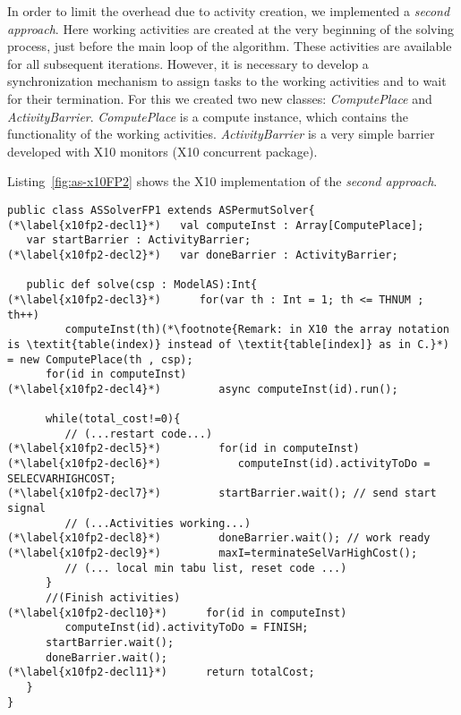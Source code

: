 \documentclass{llncs}
\begin{document}
In order to limit the overhead due to activity creation, we implemented a
\emph{second approach}. Here  working activities are created at the very
beginning of the solving process, just before the main loop of the algorithm.
These activities are available for all subsequent iterations.  However, it is
necessary to develop a synchronization mechanism to assign tasks to the
working activities and to wait for their termination. For this we created two
new classes: \emph{ComputePlace} and \emph{ActivityBarrier}.
\emph{ComputePlace} is a compute instance, which contains the functionality
of the working activities. \emph{ActivityBarrier} is a very simple barrier
developed with X10 monitors (X10 concurrent package).

Listing~\ref{fig:as-x10FP2} shows the X10 implementation of the
\emph{second approach}. 

\begin{lstlisting}[caption={Second approach to \emph{functional parallelism}},label=fig:as-x10FP2]
public class ASSolverFP1 extends ASPermutSolver{
(*\label{x10fp2-decl1}*)   val computeInst : Array[ComputePlace];
   var startBarrier : ActivityBarrier;
(*\label{x10fp2-decl2}*)   var doneBarrier : ActivityBarrier;

   public def solve(csp : ModelAS):Int{     
(*\label{x10fp2-decl3}*)      for(var th : Int = 1; th <= THNUM ; th++)
         computeInst(th)(*\footnote{Remark: in X10 the array notation is \textit{table(index)} instead of \textit{table[index]} as in C.}*) = new ComputePlace(th , csp);
      for(id in computeInst) 
(*\label{x10fp2-decl4}*)         async computeInst(id).run();
      
      while(total_cost!=0){
         // (...restart code...)
(*\label{x10fp2-decl5}*)         for(id in computeInst) 
(*\label{x10fp2-decl6}*)            computeInst(id).activityToDo = SELECVARHIGHCOST;
(*\label{x10fp2-decl7}*)         startBarrier.wait(); // send start signal
         // (...Activities working...) 
(*\label{x10fp2-decl8}*)         doneBarrier.wait(); // work ready
(*\label{x10fp2-decl9}*)         maxI=terminateSelVarHighCost();
         // (... local min tabu list, reset code ...)
      }
      //(Finish activities)
(*\label{x10fp2-decl10}*)      for(id in computeInst)
         computeInst(id).activityToDo = FINISH;
      startBarrier.wait();
      doneBarrier.wait();
(*\label{x10fp2-decl11}*)      return totalCost;
   }
}
\end{lstlisting}
\end{document}

